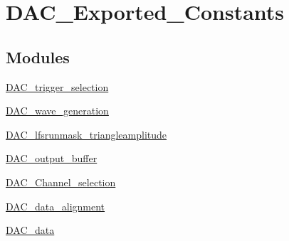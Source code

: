 \hypertarget{group__DAC__Exported__Constants}{
\section{DAC\_\-Exported\_\-Constants}
\label{group__DAC__Exported__Constants}
}
\subsection*{Modules}
\begin{DoxyCompactItemize}
\item 
\hyperlink{group__DAC__trigger__selection}{DAC\_\-trigger\_\-selection}
\item 
\hyperlink{group__DAC__wave__generation}{DAC\_\-wave\_\-generation}
\item 
\hyperlink{group__DAC__lfsrunmask__triangleamplitude}{DAC\_\-lfsrunmask\_\-triangleamplitude}
\item 
\hyperlink{group__DAC__output__buffer}{DAC\_\-output\_\-buffer}
\item 
\hyperlink{group__DAC__Channel__selection}{DAC\_\-Channel\_\-selection}
\item 
\hyperlink{group__DAC__data__alignment}{DAC\_\-data\_\-alignment}
\item 
\hyperlink{group__DAC__data}{DAC\_\-data}
\end{DoxyCompactItemize}
